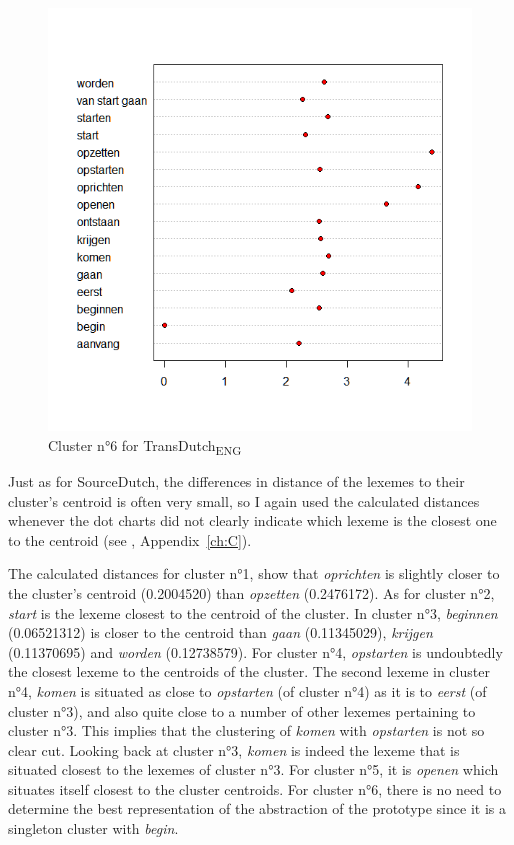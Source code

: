\begin{figure}
\includegraphics[height=.4\textheight]{figures/Vandevoorde2-img74.png}
\caption{\label{fig:4:72}  Cluster n°6 for TransDutch\textsubscript{ENG}}
\end{figure}

Just as for SourceDutch, the differences in distance of the lexemes to their cluster’s centroid is often very small, so I again used the calculated distances whenever the dot charts did not clearly indicate which lexeme is the closest one to the centroid (see , Appendix~\ref{ch:C}).

The calculated distances for cluster n°1, show that \textit{oprichten} is slightly closer to the cluster’s centroid (0.2004520) than \textit{opzetten} (0.2476172). As for cluster n°2, \textit{start} is the lexeme closest to the centroid of the cluster. In cluster n°3, \textit{beginnen} (0.06521312) is closer to the centroid than \textit{gaan} (0.11345029), \textit{krijgen} (0.11370695) and \textit{worden} (0.12738579). For cluster n°4, \textit{opstarten} is undoubtedly the closest lexeme to the centroids of the cluster. The second lexeme in cluster n°4, \textit{komen} is situated as close to \textit{opstarten} (of cluster n°4) as it is to \textit{eerst} (of cluster n°3), and also quite close to a number of other lexemes pertaining to cluster n°3. This implies that the clustering of \textit{komen} with \textit{opstarten} is not so clear cut. Looking back at cluster n°3, \textit{komen} is indeed the lexeme that is situated closest to the lexemes of cluster n°3. For cluster n°5, it is \textit{openen} which situates itself closest to the cluster centroids. For cluster n°6, there is no need to determine the best representation of the abstraction of the prototype since it is a singleton cluster with \textit{begin}.

